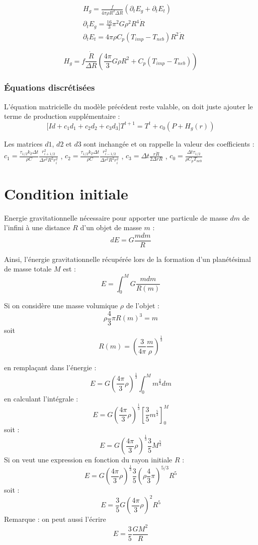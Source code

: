 \documentclass[10pt,a4paper]{article}
\numberwithin{equation}{section}
\begin{document}
\begin{align}
 &H_g = \frac{f}{4 \pi \rho R^2 \Delta R}(\partial_{t} E_g + \partial_{t} E_t) \\
 &\partial_{t} E_g =\frac{16}{3} \pi^2 G \rho^2 R^4 \dot R \\
 &\partial_{t} E_t = 4 \pi \rho C_p ( T_{imp} - T_{neb} ) R^2 \dot R
\end{align}

\begin{equation}
H_g = f\frac{\dot R}{\Delta R}(\frac{4 \pi}{3} G\rho R^2 + C_p ( T_{imp} - T_{neb} ) )
\end{equation}


\subsubsection{Équations discrétisées}

L'équation matricielle du modèle précédent reste valable, on doit juste ajouter le terme de production supplémentaire :
\begin{equation}
\Big [ Id + 
c_1  d_1 +  
c_2  d_2 +
c_3  d_3
 \Big] T^{t+1} = T^t + c_0 (P + H_g(r))
\end{equation}

Les matrices $d1$, $d2$ et $d3$ sont inchangée et on rappelle la valeur des coefficients : \\
$c_1 = \frac{\tau_{1/2} k_T \Delta t }{\rho C  }
\frac{r^2_{i+1/2}}{\Delta r^2 R^2 r^2_i}$
, $c_2 = \frac{\tau_{1/2} k_T \Delta t }{\rho C  }
\frac{r^2_{i-1/2}}{\Delta r^2 R^2 r^2_i}$
, $c_3 = \Delta t \frac{ r \dot{R}}{2\Delta r R}$
, $c_0 = \frac{\Delta t \tau_{1/2} }{\rho C_p T_{neb}}$ 

\section{Condition initiale}

Energie gravitationnelle nécessaire pour apporter une particule de masse $dm$ de l'infini à une distance $R$ d'un objet de masse $m$ :
$$ dE = G \frac{m dm}{R}$$ 

Ainsi, l'énergie gravitationnelle récupérée lors de la formation d'un planétésimal de masse totale $M$ est :
$$ E = \int_0^M G \frac{m dm}{R(m)}$$

Si on considère une masse volumique $\rho$ de l'objet :
$$\rho\frac{4}{3}\pi R(m)^3=m$$
soit 
$$R(m)=\left(\frac{3}{4\pi}\frac{m}{\rho}\right)^{\frac{1}{3}}$$

en remplaçant dans l'énergie :
$$E=G\left(\frac{4\pi}{3}\rho\right)^\frac{1}{3}\int_0^M m^\frac{2}{3}dm$$
en calculant l'intégrale :
$$E=G\left(\frac{4\pi}{3}\rho\right)^\frac{1}{3}\left[\frac{3}{5} m^\frac{5}{3}\right]_0^M$$
soit :
$$E=G\left(\frac{4\pi}{3}\rho\right)^\frac{1}{3}\frac{3}{5} M^\frac{5}{3}$$
Si on veut une expression en fonction du rayon initiale $R$ :
$$E=G\left(\frac{4\pi}{3}\rho\right)^\frac{1}{3}\frac{3}{5} \left(\rho\frac{4}{3}\pi\right)^{5/3}R^5$$
soit :
$$E=\frac{3}{5}G\left(\frac{4\pi}{3}\rho\right)^2 R^5$$
Remarque : on peut aussi l'écrire
$$ E = \frac{3}{5} \frac{GM^2}{R}$$
\end{document}
